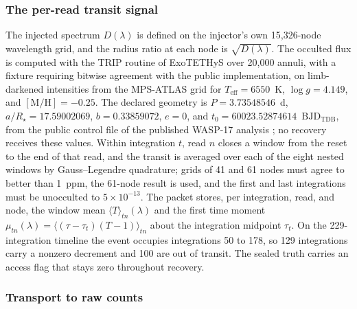 \subsubsection{The per-read transit signal}


The injected spectrum $D(\lambda)$ is defined on the injector's own
15{,}326-node wavelength grid, and the radius ratio at each node is
$\sqrt{D(\lambda)}$. The occulted flux is computed with the TRIP routine
of ExoTETHyS over 20{,}000 annuli, with a fixture requiring bitwise
agreement with the public implementation, on limb-darkened intensities
from the MPS-ATLAS grid for $T_{\mathrm{eff}}=6550$~K, $\log g=4.149$,
and $[\mathrm{M}/\mathrm{H}]=-0.25$.
The declared geometry is $P=3.73548546$~d, $a/R_\star=17.59002069$,
$b=0.33859072$, $e=0$, and $t_0=60023.52874614$~$\mathrm{BJD_{TDB}}$,
from the public control file of the published WASP-17 analysis
\citep{LouieEtAl2025}; no recovery receives these values. Within
integration $t$, read $n$ closes a window from the reset to the end of
that read, and the transit is averaged over each of the eight nested
windows by Gauss--Legendre quadrature; grids of 41 and 61 nodes must
agree to better than 1~ppm, the 61-node result is used, and the first
and last integrations must be unocculted to $5\times10^{-13}$. The
packet stores, per integration, read, and node, the window mean
$\langle T\rangle_{tn}(\lambda)$ and the first time moment
$\mu_{tn}(\lambda)=\langle(\tau-\tau_t)(T-1)\rangle_{tn}$ about the
integration midpoint $\tau_t$. On the 229-integration timeline the event
occupies integrations 50 to 178, so 129 integrations carry a nonzero
decrement and 100 are out of transit. The sealed truth carries an access
flag that stays zero throughout recovery.

\subsubsection{Transport to raw counts}

